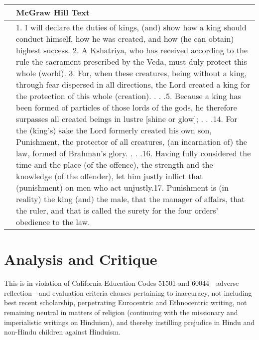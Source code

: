 \begin{longtable}{|>{\raggedleft}p{1.5cm}|p{8.5cm}|}
\multicolumn{2}{|c|{\textbf{Table: 5}} 
\hline
\multicolumn{1}{|l|}{\textbf{Page #}} & \multicolumn{1}{|l|}{\textbf{McGraw Hill Text}} \tabularnewline
\hline 
281 & 1. I will declare the duties of kings, (and) show how a king should conduct himself, how he was created, and how (he can obtain) highest success. 2. A Kshatriya, who has received according to the rule the sacrament prescribed by the Veda, must duly protect this whole (world). 3. For, when these creatures, being without a king, through fear dispersed in all directions, the Lord created a king for the protection of this whole (creation). . . .5. Because a king has been formed of particles of those lords of the gods, he therefore surpasses all created beings in lustre [shine or glow]; . . .14. For the (king’s) sake the Lord formerly created his own son, Punishment, the protector of all creatures, (an incarnation of) the law, formed of Brahman’s glory. . . .16. Having fully considered the time and the place (of the offence), the strength and the knowledge (of the offender), let him justly inflict that (punishment) on men who act unjustly.17. Punishment is (in reality) the king (and) the male, that the manager of affairs, that the ruler, and that is called the surety for the four orders’ obedience to the law. \tabularnewline
\hline
\end{longtable}

\section*{Analysis and Critique} 

This is in violation of California Education Codes 51501 and 60044—adverse reflection—and evaluation criteria clauses pertaining to inaccuracy, not including best recent scholarship, perpetrating Eurocentric and Ethnocentric writing, not remaining neutral in matters of religion (continuing with the missionary and imperialistic writings on Hinduism), and thereby instilling prejudice in Hindu and non-Hindu children against Hinduism.

